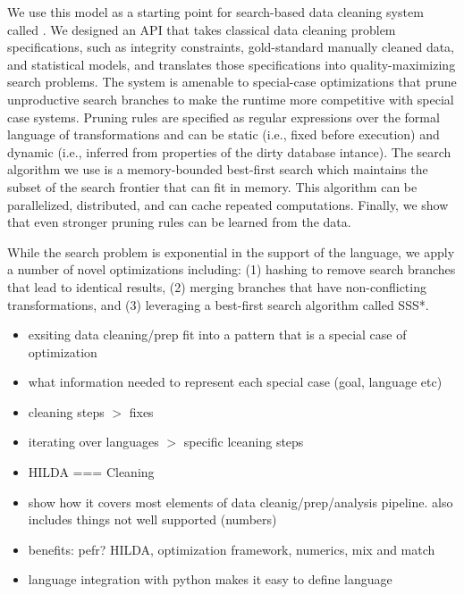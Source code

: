 We use this model as a starting point for search-based data cleaning system called \sys.
We designed an API that takes classical data cleaning problem specifications, such as integrity constraints, gold-standard manually cleaned data, and statistical models, and translates those specifications into quality-maximizing search problems. 
The system is amenable to special-case optimizations that prune unproductive search branches to make the runtime more competitive with special case systems.
Pruning rules are specified as regular expressions over the formal language of transformations and can be static (i.e., fixed before execution) and dynamic (i.e., inferred from properties of the dirty database intance).
The search algorithm we use is a memory-bounded best-first search which maintains the subset of the search frontier that can fit in memory. 
This algorithm can be parallelized, distributed, and can cache repeated computations.
Finally, we show that even stronger pruning rules can be learned from the data.
























\iffalse
While the search problem is exponential in the support of the language, we apply a number of novel optimizations including:  (1) hashing to remove search branches that lead to identical results, (2) merging branches that have non-conflicting  transformations,  and  (3)  leveraging  a best-first search algorithm called SSS*.

\begin{itemize}
  \item exsiting data cleaning/prep fit into a pattern that is a special case of optimization
  \item what information needed to represent each special case (goal, language etc)
  \item cleaning steps $>$ fixes
  \item iterating over languages $>$ specific lceaning steps
  \item HILDA === Cleaning
  \item show how it covers most elements of data cleanig/prep/analysis pipeline.  also includes things not well supported (numbers)
  \item benefits: pefr? HILDA, optimization framework, numerics, mix and match
  \item language integration with python makes it easy to define language
\end{itemize}

